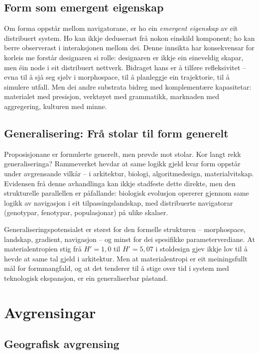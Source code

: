 \documentclass[12pt,a4paper,oneside]{report}
\begin{document}
\subsection{Form som emergent eigenskap}

Om forma oppstår mellom navigatorane, er ho ein \emph{emergent eigenskap} av eit distribuert system. Ho kan ikkje deduserast frå nokon einskild komponent; ho kan berre observerast i interaksjonen mellom dei. Denne innsikta har konsekvensar for korleis me forstår designaren si rolle: designaren er ikkje ein eineveldig skapar, men éin node i eit distribuert nettverk. Bidraget hans er å tilføre refleksivitet -- evna til å sjå seg sjølv i morphospace, til å planleggje ein trajektorie, til å simulere utfall. Men dei andre substrata bidreg med komplementære kapasitetar: materialet med presisjon, verktøyet med grammatikk, marknaden med aggregering, kulturen med minne.

\subsection{Generalisering: Frå stolar til form generelt}

Proposisjonane er formulerte generelt, men prøvde mot stolar. Kor langt rekk generaliseringa? Rammeverket hevdar at same logikk gjeld kvar form oppstår under avgrensande vilkår -- i arkitektur, biologi, algoritmedesign, materialvitskap. Evidensen frå denne avhandlinga kan ikkje stadfeste dette direkte, men den strukturelle parallellen er påfallande: biologisk evolusjon opererer gjennom same logikk av navigasjon i eit tilpassingslandskap, med distribuerte navigatorar (genotypar, fenotypar, populasjonar) på ulike skalaer.

Generaliseringspotensialet er størst for den formelle strukturen -- morphospace, landskap, gradient, navigasjon -- og minst for dei spesifikke parameterverdiane. At materialentropien stig frå $H' = 1{,}0$ til $H' = 5{,}07$ i stoldesign gjev ikkje lov til å hevde at same tal gjeld i arkitektur. Men at materialentropi er eit meiningsfullt mål for formmangfald, og at det tenderer til å stige over tid i system med teknologisk ekspansjon, er ein generaliserbar påstand.

\section{Avgrensingar}

\subsection{Geografisk avgrensing}
\end{document}

